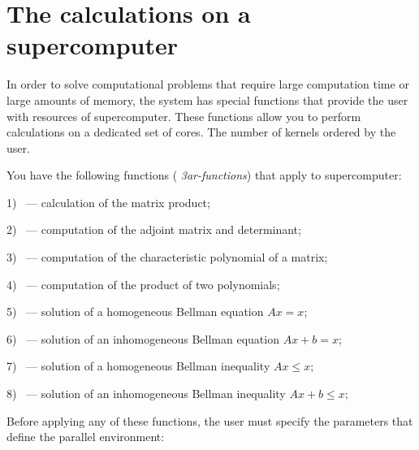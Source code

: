 \chapter{The calculations on a supercomputer}
In order to solve computational problems that require large computation time or large amounts of memory, the system has special functions that provide the user with resources of
supercomputer. These functions allow you to perform calculations on a dedicated set of cores. The number of kernels ordered by the user.

You have the following functions ( {\it 3ar-functions}) that apply to supercomputer:

1) ~--- calculation of the matrix product;

2) ~--- computation of the adjoint matrix and determinant;

3) ~--- computation of the characteristic polynomial of a matrix;

4) ~--- computation of the product of two polynomials;

5) ~---  solution of a homogeneous Bellman equation  $Ax=x$;

6) ~--- solution of an inhomogeneous Bellman equation   $Ax+b=x$;

7) ~--- solution of a homogeneous Bellman  inequality $Ax\leq x$;

8) ~--- solution of an inhomogeneous Bellman  inequality $Ax+b\leq x$; 

 







 
 
Before applying any of these functions, the user must specify the parameters that define the parallel environment:

